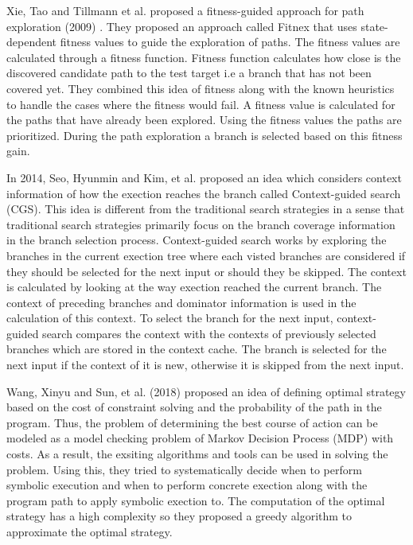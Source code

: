 \documentclass[	runningheads,
				a4paper]{llncs}
\begin{document}
Xie, Tao and Tillmann et al. proposed a fitness-guided approach for path exploration (2009) \cite{xie2009fitness}. They proposed an approach called Fitnex that uses state-dependent fitness values to guide the exploration of paths. The fitness values are calculated through a fitness function. Fitness function calculates how close is the discovered candidate path to the test target i.e a branch that has not been covered yet. They combined this idea of fitness along with the known heuristics to handle the cases where the fitness would fail. A fitness value is calculated for the paths that have already been explored. Using the fitness values the paths are prioritized. During the path exploration a branch is selected based on this fitness gain. 

In 2014, Seo, Hyunmin and Kim, et al. proposed an idea \cite{seo2014we} which considers context information of how the exection reaches the branch called Context-guided search (CGS). This idea is different from the traditional search strategies in a sense that traditional search strategies primarily focus on the branch coverage information in the branch selection process. Context-guided search works by exploring the branches in the current exection tree where each visted branches are considered if they should be selected for the next input or should they be skipped. The context is calculated by looking at the way exection reached the current branch. The context of preceding branches and dominator information is used in the calculation of this context. To select the branch for the next input, context-guided search compares the context with the contexts of previously selected branches which are stored in the context cache. The branch is selected for the next input if the context of it is new, otherwise it is skipped from the next input.

Wang, Xinyu and Sun, et al. (2018) proposed an idea \cite{wang2018towards}  of defining optimal strategy based on the cost of constraint solving and the probability of the path in the program. Thus, the problem of determining the best course of action can be modeled as a model checking problem of Markov Decision Process (MDP) with costs. As a result, the exsiting algorithms and tools can be used in solving the problem. Using this, they tried to  systematically decide when to perform symbolic execution and when to perform concrete exection along with the program path to apply symbolic exection to. 
The computation of the optimal strategy has a high complexity so they proposed a greedy algorithm to approximate the optimal strategy.
\end{document}
